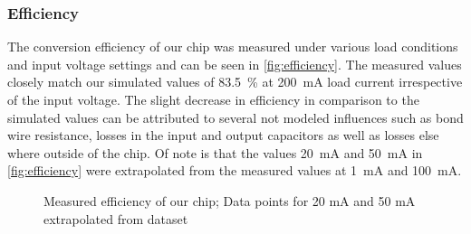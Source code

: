 \subsubsection{Efficiency}

The conversion efficiency of our chip was measured under various load conditions and input voltage settings and can be seen in \autoref{fig:efficiency}. The measured values closely match our simulated values of \qty{83.5}{\percent} at \qty{200}{\milli\ampere} load current irrespective of the input voltage. The slight decrease in efficiency in comparison to the simulated values can be attributed to several not modeled influences such as bond wire resistance, losses in the input and output capacitors as well as losses else where outside of the chip. Of note is that the values \qty{20}{\milli\ampere} and \qty{50}{\milli\ampere} in \autoref{fig:efficiency} were extrapolated from the measured values at \qty{1}{\milli\ampere} and \qty{100}{\milli\ampere}.
\begin{figure}[h]
    \centering
    
    \caption{Measured efficiency of our chip; Data points for 20 mA and 50 mA extrapolated from dataset}
    \label{fig:efficiency}
\end{figure}

